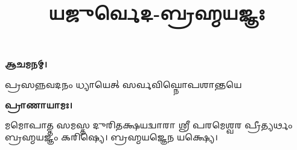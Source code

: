 \setmainfont[Scale=0.50,Script=Grantha,Mapping=tex-text,Mapping=devanagarinumerals,AutoFakeBold=2.0]{Noto Serif Grantha}
\title{\Huge 𑌯𑌜𑍁𑌰𑍍𑌵𑍇𑌦-𑌬𑍍𑌰𑌹𑍍𑌮𑌯𑌜𑍍𑌞𑌃}
\date{}
\maketitle
\clearemptydoublepage
{}


\textbf{𑌆𑌚𑌮𑌨𑌮𑍍।}

{𑌪𑍍𑌰𑌸𑌨𑍍𑌨𑌵𑌦𑌨𑌂 𑌧𑍍𑌯𑌾𑌯𑍇𑌤𑍍 𑌸𑌰𑍍𑌵𑌵𑌿𑌘𑍍𑌨𑍋𑌪𑌶𑌾𑌨𑍍𑌤𑌯𑍇}

\textbf{𑌪𑍍𑌰𑌾𑌣𑌾𑌯𑌾𑌮𑌃।}

𑌮𑌮𑍋𑌪𑌾𑌤𑍍𑌤 𑌸𑌮𑌸𑍍𑌤 𑌦𑍁𑌰𑌿𑌤𑌕𑍍𑌷𑌯𑌦𑍍𑌵𑌾𑌰𑌾 𑌶𑍍𑌰𑍀 𑌪𑌰𑌮𑍇𑌶𑍍𑌵𑌰 𑌪𑍍𑌰𑍀𑌤𑍍𑌯𑌰𑍍𑌥𑌂 𑌬𑍍𑌰𑌹𑍍𑌮𑌯𑌜𑍍𑌞𑌂 𑌕𑌰𑌿𑌷𑍍𑌯𑍇। 𑌬𑍍𑌰𑌹𑍍𑌮𑌯𑌜𑍍𑌞𑍇𑌨 𑌯𑌕𑍍𑌷𑍍𑌯𑍇।


